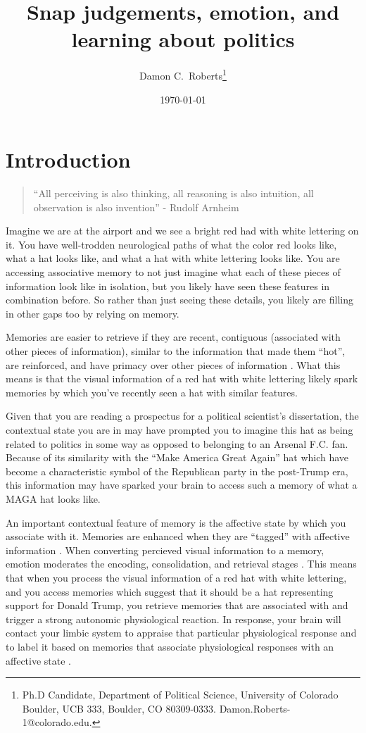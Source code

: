 \documentclass [12pt]{article}
\title{Snap judgements, emotion, and learning about politics}
\author{Damon C.\ Roberts\footnote{Ph.D Candidate,
Department of Political Science, University of Colorado Boulder, UCB 333, Boulder, CO 80309-0333. Damon.Roberts-1@colorado.edu.}}
\date{\today}
\begin{document}
\maketitle


\newpage
\doublespace
\newpage
\section*{Introduction}

\begin{quote}
    ``All perceiving is also thinking, all reasoning is also intuition, all observation is also invention'' - Rudolf Arnheim
\end{quote}

Imagine we are at the airport and we see a bright red had with white lettering on it. You have well-trodden neurological paths of what the color red looks like, what a hat looks like, and what a hat with white lettering looks like. You are accessing associative memory to not just imagine what each of these pieces of information look like in isolation, but you likely have seen these features in combination before. So rather than just seeing these details, you likely are filling in other gaps too by relying on memory.

Memories are easier to retrieve if they are recent, contiguous (associated with other pieces of information), similar to the information that made them ``hot'', are reinforced, and have primacy over other pieces of information \citep{kahana_et-al_2022_ohhum}. What this means is that the visual information of a red hat with white lettering likely spark memories by which you've recently seen a hat with similar features.

Given that you are reading a prospectus for a political scientist's dissertation, the contextual state you are in may have prompted you to imagine this hat as being related to politics in some way as opposed to belonging to an Arsenal F.C. fan. Because of its similarity with the ``Make America Great Again'' hat which have become a characteristic symbol of the Republican party in the post-Trump era, this information may have sparked your brain to access such a memory of what a MAGA hat looks like. 

An important contextual feature of memory is the affective state by which you associate with it. Memories are enhanced when they are ``tagged'' with affective information \citep{kensinger_fields_2022_ohhum}. When converting percieved visual information to a memory, emotion moderates the encoding, consolidation, and retrieval stages \citep{kensinger_fields_2022_ohhum}. This means that when you process the visual information of a red hat with white lettering, and you access memories which suggest that it should be a hat representing support for Donald Trump, you retrieve memories that are associated with and trigger a strong autonomic physiological reaction. In response, your brain will contact your limbic system to appraise that particular physiological response and to label it based on memories that associate physiological responses with an affective state \citep{valentino_et-al_2011_jop}.
\end{document}
